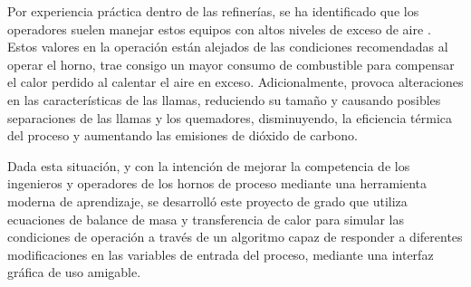 \par Por experiencia práctica dentro de las refinerías, se ha identificado que los operadores suelen manejar estos equipos con altos niveles de exceso de aire \cite{bib:thermox}. Estos valores en la operación están alejados de las condiciones recomendadas al operar el horno, trae consigo un mayor consumo de combustible para compensar el calor perdido al calentar el aire en exceso. Adicionalmente, provoca alteraciones en las características de las llamas, reduciendo su tamaño y causando posibles separaciones de las llamas y los quemadores, disminuyendo, la eficiencia térmica del proceso y aumentando las emisiones de dióxido de carbono.

\par Dada esta situación, y con la intención de mejorar la competencia de los ingenieros y operadores de los hornos de proceso mediante una herramienta moderna de aprendizaje, se desarrolló este proyecto de grado que utiliza ecuaciones de balance de masa y transferencia de calor para simular las condiciones de operación a través de un algoritmo capaz de responder a diferentes modificaciones en las variables de entrada del proceso, mediante una interfaz gráfica de uso amigable.